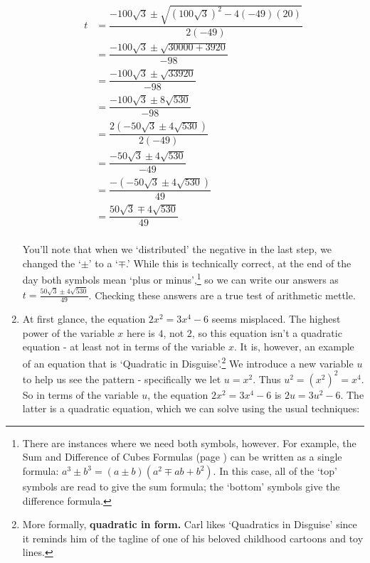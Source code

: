 \begin{ex}
\begin{enumerate}
\begin{align*}
t & = \dfrac{-100\sqrt{3} \pm \sqrt{(100\sqrt{3})^2 - 4(-49)(20)}}{2(-49)} \\
& = \dfrac{-100\sqrt{3} \pm \sqrt{30000 +3920}}{-98}  \\
& = \dfrac{-100\sqrt{3} \pm \sqrt{33920}}{-98} \\
& = \dfrac{-100\sqrt{3} \pm 8\sqrt{530}}{-98} \\
& = \dfrac{2(-50\sqrt{3} \pm 4\sqrt{530})}{2(-49)}  \\
& = \dfrac{-50\sqrt{3} \pm 4\sqrt{530}}{-49}  \tag{Reduce} \\
& = \dfrac{-(-50\sqrt{3} \pm 4\sqrt{530})}{49}  \tag{Properties of Negatives} \\
& = \dfrac{50\sqrt{3} \mp 4\sqrt{530}}{49} \tag{Distribute} \\ 
\end{align*}

You'll note that when we `distributed' the negative in the last step, we changed the `$\pm$' to a `$\mp$.'  While this is technically correct, at the end of the day both symbols mean `plus or minus',\footnote{There are instances where we need both symbols, however.  For example, the Sum and Difference of Cubes Formulas (page \pageref{CommonFactoringFormulas}) can be written as a single formula:  $a^3 \pm b^3 = (a \pm b) (a^2 \mp ab + b^2)$.  In this case, all of the `top' symbols are read to give the sum formula;  the `bottom' symbols give the difference formula.} so we can write our answers as $t =  \frac{50\sqrt{3} \pm 4\sqrt{530}}{49}$. Checking these answers are a true test of arithmetic mettle.

\item At first glance, the equation $2x^2 = 3x^4 - 6$ seems misplaced.  The highest power of the variable $x$ here is $4$, not $2$, so this equation isn't a quadratic equation - at least not in terms of the variable $x$.  It is, however, an example of an equation that is `Quadratic in Disguise'.\footnote{More formally, \textbf{quadratic in form.} Carl likes `Quadratics in Disguise' since it reminds him of the tagline of one of his beloved childhood cartoons and toy lines.} We introduce a new variable $u$ to help us see the pattern - specifically we let $u = x^2$.  Thus $u^2 = (x^2)^2 = x^4$.  So in terms of the variable $u$, the equation $2x^2 = 3x^4 - 6$ is $2u = 3u^2 - 6$.  The latter is a quadratic equation, which we can solve using the usual techniques:


\end{enumerate}
\end{ex}
